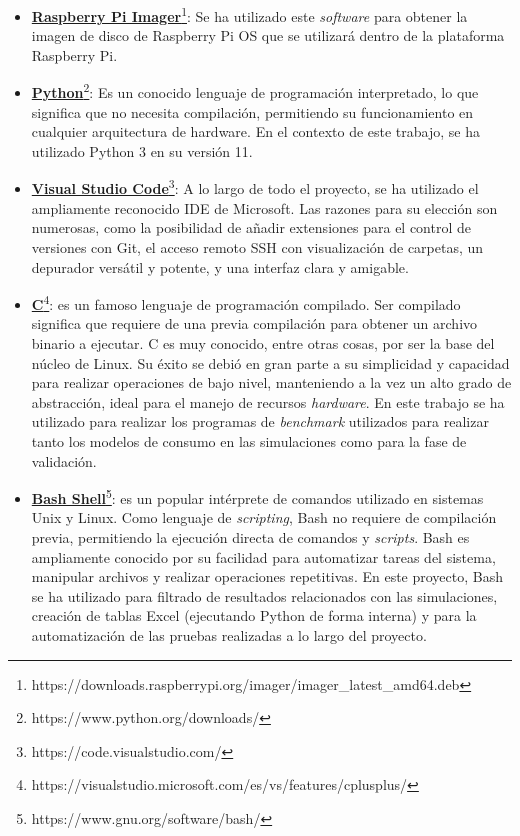 \begin{itemize}
    \item \textbf{\href{https://downloads.raspberrypi.org/imager/imager_latest_amd64.deb}{Raspberry Pi Imager}}\footnote{https://downloads.raspberrypi.org/imager/imager\_latest\_amd64.deb}: Se ha utilizado este \textit{software} para obtener la imagen de disco de Raspberry Pi OS que se utilizará dentro de la plataforma Raspberry Pi.
    
    \item \textbf{\href{https://www.python.org/downloads/}{Python}}\footnote{https://www.python.org/downloads/}: Es un conocido lenguaje de programación interpretado, lo que significa que no necesita compilación, permitiendo su funcionamiento en cualquier arquitectura de hardware. En el contexto de este trabajo, se ha utilizado Python 3 en su versión 11.

    \item \textbf{\href{https://code.visualstudio.com/}{Visual Studio Code}}\footnote{https://code.visualstudio.com/}: A lo largo de todo el proyecto, se ha utilizado el ampliamente reconocido \ac{IDE} de Microsoft. Las razones para su elección son numerosas, como la posibilidad de añadir extensiones para el control de versiones con Git, el acceso remoto SSH con visualización de carpetas, un depurador versátil y potente, y una interfaz clara y amigable.
    
    \item \textbf{\href{https://visualstudio.microsoft.com/es/vs/features/cplusplus/}{C}}\footnote{https://visualstudio.microsoft.com/es/vs/features/cplusplus/}: es un famoso lenguaje de programación compilado. Ser compilado significa que requiere de una previa compilación para obtener un archivo binario a ejecutar. C es muy conocido, entre otras cosas, por ser la base del núcleo de Linux. Su éxito se debió en gran parte a su simplicidad y capacidad para realizar operaciones de bajo nivel, manteniendo a la vez un alto grado de abstracción, ideal para el manejo de recursos \textit{hardware}. En este trabajo se ha utilizado para realizar los programas de \textit{benchmark} utilizados para realizar tanto los modelos de consumo en las simulaciones como para la fase de validación.  

    \item \textbf{\href{https://www.gnu.org/software/bash/}{Bash Shell}}\footnote{https://www.gnu.org/software/bash/}: es un popular intérprete de comandos utilizado en sistemas Unix y Linux. Como lenguaje de \textit{scripting}, Bash no requiere de compilación previa, permitiendo la ejecución directa de comandos y \textit{scripts}. Bash es ampliamente conocido por su facilidad para automatizar tareas del sistema, manipular archivos y realizar operaciones repetitivas. En este proyecto, Bash se ha utilizado para filtrado de resultados relacionados con las simulaciones, creación de tablas Excel (ejecutando Python de forma interna) y para la automatización de las pruebas realizadas a lo largo del proyecto.
    

\end{itemize}

